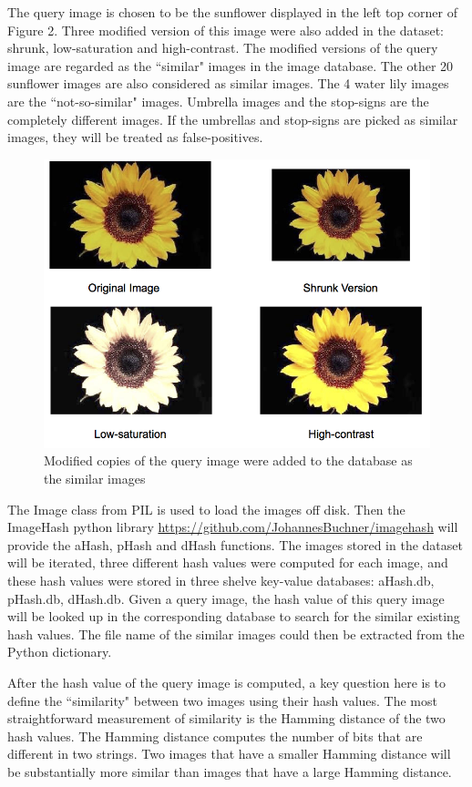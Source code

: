\documentclass[letterpaper,12pt]{article}
\begin{document}
The query image is chosen to be the sunflower displayed in the left top corner of Figure 2. Three modified version of this image were also added in the dataset: shrunk, low-saturation and high-contrast. The modified versions of the query image are regarded as the ``similar" images in the image database. The other 20 sunflower images are also considered as similar images. The 4 water lily images are the ``not-so-similar" images. Umbrella images and the stop-signs are the completely different images. If the umbrellas and stop-signs are picked as similar images, they will be treated as false-positives.

\begin{figure}[h!]
	\centering
	\includegraphics[scale=0.6]{figures/figure_2}
	\caption{Modified copies of the query image were added to the database as the similar images}
\end{figure}

The Image class from PIL is used to load the images off disk. Then the ImageHash python library  \url{https://github.com/JohannesBuchner/imagehash} will provide the aHash, pHash and dHash functions. The images stored in the dataset will be iterated, three different hash values were computed for each image, and these hash values were stored in three shelve key-value databases: aHash.db, pHash.db, dHash.db. Given a query image, the hash value of this query image will be looked up in the corresponding database to search for the similar existing hash values. The file name of the similar images could then be extracted from the Python dictionary.

After the hash value of the query image is computed, a key question here is to define the ``similarity" between two images using their hash values. The most straightforward measurement of similarity is the Hamming distance of the two hash values. The Hamming distance computes the number of bits that are different in two strings. Two images that have a smaller Hamming distance will be substantially more similar than images that have a large Hamming distance.
\end{document}

